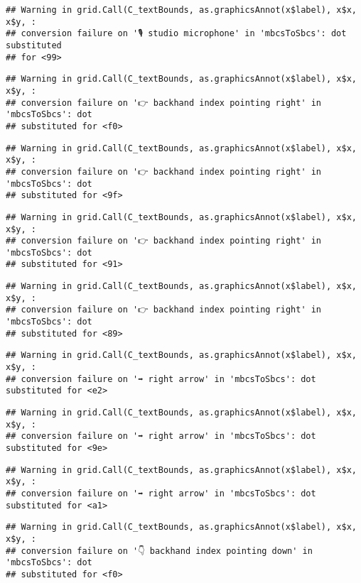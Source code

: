\documentclass[
]{article}
\begin{document}
\begin{verbatim}
## Warning in grid.Call(C_textBounds, as.graphicsAnnot(x$label), x$x, x$y, :
## conversion failure on '🎙 studio microphone' in 'mbcsToSbcs': dot substituted
## for <99>
\end{verbatim}

\begin{verbatim}
## Warning in grid.Call(C_textBounds, as.graphicsAnnot(x$label), x$x, x$y, :
## conversion failure on '👉 backhand index pointing right' in 'mbcsToSbcs': dot
## substituted for <f0>
\end{verbatim}

\begin{verbatim}
## Warning in grid.Call(C_textBounds, as.graphicsAnnot(x$label), x$x, x$y, :
## conversion failure on '👉 backhand index pointing right' in 'mbcsToSbcs': dot
## substituted for <9f>
\end{verbatim}

\begin{verbatim}
## Warning in grid.Call(C_textBounds, as.graphicsAnnot(x$label), x$x, x$y, :
## conversion failure on '👉 backhand index pointing right' in 'mbcsToSbcs': dot
## substituted for <91>
\end{verbatim}

\begin{verbatim}
## Warning in grid.Call(C_textBounds, as.graphicsAnnot(x$label), x$x, x$y, :
## conversion failure on '👉 backhand index pointing right' in 'mbcsToSbcs': dot
## substituted for <89>
\end{verbatim}

\begin{verbatim}
## Warning in grid.Call(C_textBounds, as.graphicsAnnot(x$label), x$x, x$y, :
## conversion failure on '➡ right arrow' in 'mbcsToSbcs': dot substituted for <e2>
\end{verbatim}

\begin{verbatim}
## Warning in grid.Call(C_textBounds, as.graphicsAnnot(x$label), x$x, x$y, :
## conversion failure on '➡ right arrow' in 'mbcsToSbcs': dot substituted for <9e>
\end{verbatim}

\begin{verbatim}
## Warning in grid.Call(C_textBounds, as.graphicsAnnot(x$label), x$x, x$y, :
## conversion failure on '➡ right arrow' in 'mbcsToSbcs': dot substituted for <a1>
\end{verbatim}

\begin{verbatim}
## Warning in grid.Call(C_textBounds, as.graphicsAnnot(x$label), x$x, x$y, :
## conversion failure on '👇 backhand index pointing down' in 'mbcsToSbcs': dot
## substituted for <f0>
\end{verbatim}
\end{document}
